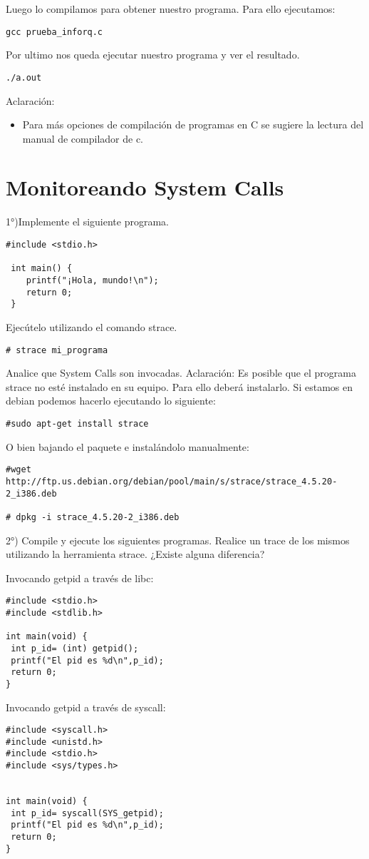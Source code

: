 Luego lo compilamos para obtener nuestro programa. Para ello ejecutamos:
\begin{verbatim}
gcc prueba_inforq.c
\end{verbatim}

Por ultimo nos queda ejecutar nuestro programa y ver el resultado.
\begin{verbatim}
./a.out
\end{verbatim}

Aclaración: 
\begin{itemize}  
\item Para más opciones de compilación de programas en C se sugiere la lectura del manual de compilador de c.
\end{itemize}  


\section{Monitoreando System Calls}
1°)Implemente el siguiente programa.
\begin{verbatim}
#include <stdio.h>
 
 int main() {
    printf("¡Hola, mundo!\n");
    return 0;
 }
\end{verbatim}


Ejecútelo utilizando el comando strace.

\begin{verbatim}
# strace mi_programa
\end{verbatim}


Analice que System Calls son invocadas.
Aclaración: 
Es posible que el programa strace no esté instalado en su equipo. Para ello deberá instalarlo. Si estamos en debian podemos hacerlo ejecutando lo siguiente:

\begin{verbatim}
#sudo apt-get install strace
\end{verbatim}

O bien bajando el paquete e instalándolo manualmente:

\begin{verbatim}
#wget http://ftp.us.debian.org/debian/pool/main/s/strace/strace_4.5.20-2_i386.deb

# dpkg -i strace_4.5.20-2_i386.deb
\end{verbatim}

2°) Compile y ejecute los siguientes programas. Realice un trace de los mismos utilizando la herramienta strace. ¿Existe alguna diferencia?

Invocando getpid a través de libc:

\begin{verbatim}
#include <stdio.h>
#include <stdlib.h>
 
int main(void) {
 int p_id= (int) getpid();
 printf("El pid es %d\n",p_id);
 return 0;
}
\end{verbatim}

Invocando getpid a través de syscall:
\begin{verbatim}
#include <syscall.h>
#include <unistd.h>
#include <stdio.h>
#include <sys/types.h>

 
int main(void) {
 int p_id= syscall(SYS_getpid);
 printf("El pid es %d\n",p_id);
 return 0;
}
\end{verbatim}
